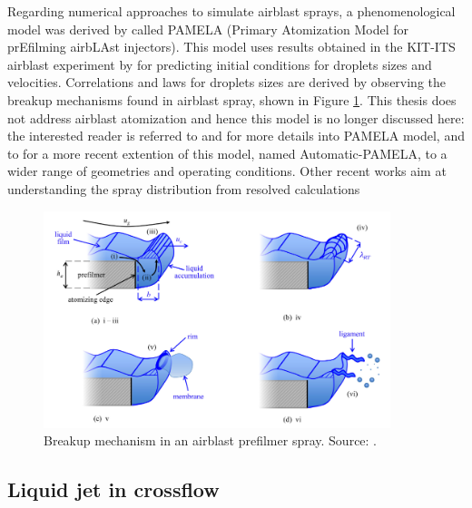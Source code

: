 Regarding numerical approaches to simulate airblast sprays, a phenomenological model was derived by  called PAMELA (Primary Atomization Model for prEfilming airbLAst injectors). This model uses results obtained in the KIT-ITS airblast experiment by  for predicting initial conditions for droplets sizes and velocities. Correlations and laws for droplets sizes are derived by observing the breakup mechanisms found in airblast spray, shown in Figure \ref{fig:airblast_breakup_mechanism_chaussonnet}. This thesis does not address airblast atomization and hence this model is no longer discussed here: the interested reader is referred to  and  for more details into PAMELA model, and to  for a more recent extention of this model, named Automatic-PAMELA, to a wider range of geometries and operating conditions. Other recent works aim at understanding the spray distribution from resolved calculations 


\begin{figure}[ht]
    \centering
    \includegraphics[width=0.9\textwidth]{./part1_numerical_approaches/figures_ch3/airblast_breakup_mechanism_chaussonnet}
       \centering
    \caption[Breakup mechanism in an airblast prefilmer spray]{Breakup mechanism in an airblast prefilmer spray. Source: .}
    \label{fig:airblast_breakup_mechanism_chaussonnet}
\end{figure}




\subsection{Liquid jet in crossflow}
\label{ch3:subsec_lagrangian_liquid_JICF}

